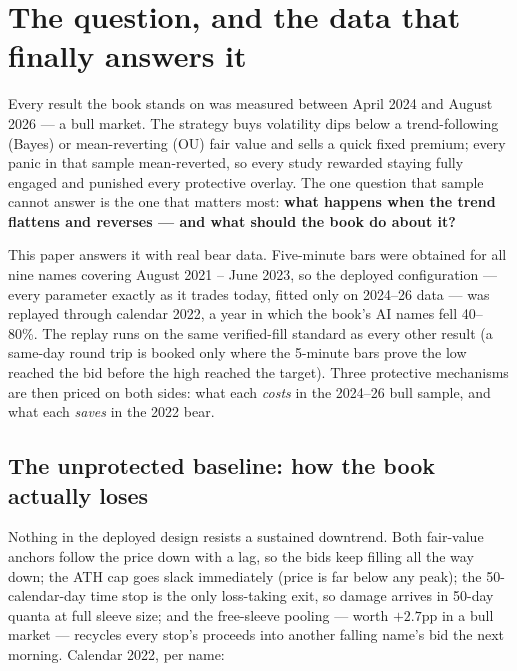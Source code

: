 \documentclass[11pt,a4paper]{article}
\begin{document}
\section{The question, and the data that finally answers it}

Every result the book stands on was measured between April 2024 and August 2026
--- a bull market. The strategy buys volatility dips below a trend-following (Bayes)
or mean-reverting (OU) fair value and sells a quick fixed premium; every panic in
that sample mean-reverted, so every study rewarded staying fully engaged and
punished every protective overlay. The one question that sample cannot answer is
the one that matters most: \textbf{what happens when the trend flattens and
reverses --- and what should the book do about it?}

This paper answers it with real bear data. Five-minute bars were obtained for all
nine names covering August 2021 -- June 2023, so the deployed configuration ---
every parameter exactly as it trades today, fitted only on 2024--26 data --- was
replayed through calendar 2022, a year in which the book's AI names fell 40--80\%.
The replay runs on the same verified-fill standard as every other result (a
same-day round trip is booked only where the 5-minute bars prove the low reached
the bid before the high reached the target). Three protective mechanisms are then
priced on both sides: what each \emph{costs} in the 2024--26 bull sample, and what
each \emph{saves} in the 2022 bear.

\subsection{The unprotected baseline: how the book actually loses}

Nothing in the deployed design resists a sustained downtrend. Both fair-value
anchors follow the price down with a lag, so the bids keep filling all the way
down; the ATH cap goes slack immediately (price is far below any peak); the
50-calendar-day time stop is the only loss-taking exit, so damage arrives in
50-day quanta at full sleeve size; and the free-sleeve pooling --- worth
$+2.7$pp in a bull market --- recycles every stop's proceeds into another falling
name's bid the next morning. Calendar 2022, per name:
\end{document}
